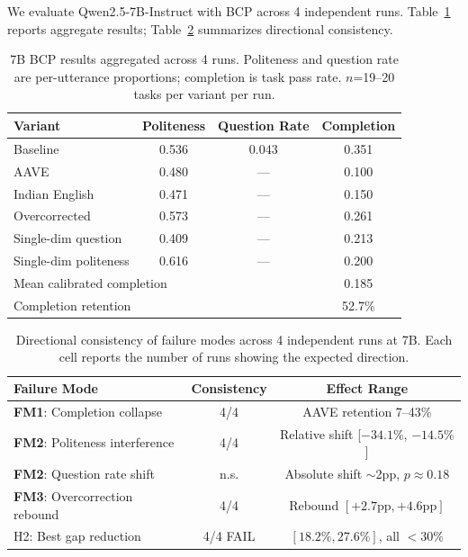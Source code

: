 \documentclass[11pt]{article}
\newcommand{\fm}[1]{\textbf{FM#1}}
\begin{document}
We evaluate Qwen2.5-7B-Instruct with BCP across 4 independent runs. Table~\ref{tab:7b_aggregate} reports aggregate results; Table~\ref{tab:directional} summarizes directional consistency.

\begin{table}[t]
\centering
\small
\caption{7B BCP results aggregated across 4 runs. Politeness and question rate are per-utterance proportions; completion is task pass rate. $n$=19--20 tasks per variant per run.}
\label{tab:7b_aggregate}
\begin{tabular}{lccc}
\toprule
\textbf{Variant} & \textbf{Politeness} & \textbf{Question Rate} & \textbf{Completion} \\
\midrule
Baseline         & 0.536 & 0.043 & 0.351 \\
AAVE             & 0.480 & ---   & 0.100 \\
Indian English   & 0.471 & ---   & 0.150 \\
Overcorrected    & 0.573 & ---   & 0.261 \\
Single-dim question   & 0.409 & ---   & 0.213 \\
Single-dim politeness & 0.616 & ---   & 0.200 \\
\midrule
\multicolumn{3}{l}{Mean calibrated completion} & 0.185 \\
\multicolumn{3}{l}{Completion retention} & 52.7\% \\
\bottomrule
\end{tabular}
\end{table}

\begin{table}[t]
\centering
\small
\caption{Directional consistency of failure modes across 4 independent runs at 7B. Each cell reports the number of runs showing the expected direction.}
\label{tab:directional}
\begin{tabular}{lcc}
\toprule
\textbf{Failure Mode} & \textbf{Consistency} & \textbf{Effect Range} \\
\midrule
\fm{1}: Completion collapse    & 4/4 & AAVE retention 7--43\% \\
\fm{2}: Politeness interference & 4/4 & Relative shift [$-34.1\%$, $-14.5\%$] \\
\fm{2}: Question rate shift     & n.s. & Absolute shift $\sim$2pp, $p \approx 0.18$ \\
\fm{3}: Overcorrection rebound  & 4/4 & Rebound $[+2.7\text{pp}, +4.6\text{pp}]$ \\
\midrule
H2: Best gap reduction & 4/4 FAIL & $[18.2\%, 27.6\%]$, all $< 30\%$ \\
\bottomrule
\end{tabular}
\end{table}
\end{document}
